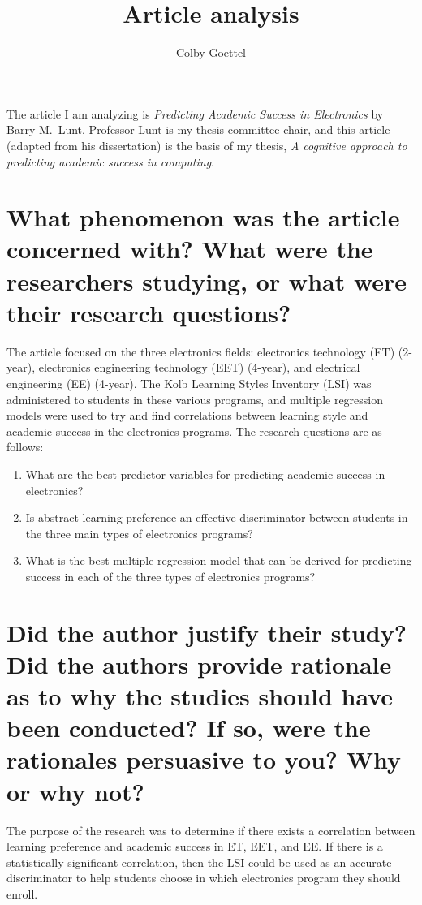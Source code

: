 \documentclass[12pt]{article}
\title{Article analysis}
\author{Colby Goettel}
\begin{document}
\maketitle

The article I am analyzing is \textit{Predicting Academic Success in Electronics} by Barry M.\ Lunt. Professor Lunt is my thesis committee chair, and this article (adapted from his dissertation) is the basis of my thesis, \textit{A cognitive approach to predicting academic success in computing}.

\section{What phenomenon was the article concerned with? What were the researchers studying, or what were their research questions?}
The article focused on the three electronics fields: electronics technology (ET) (2-year), electronics engineering technology (EET) (4-year), and electrical engineering (EE) (4-year). The Kolb Learning Styles Inventory (LSI) was administered to students in these various programs, and multiple regression models were used to try and find correlations between learning style and academic success in the electronics programs. The research questions are as follows:
\begin{enumerate}
    \item What are the best predictor variables for predicting academic success in electronics?
    \item Is abstract learning preference an effective discriminator between students in the three main types of electronics programs?
    \item What is the best multiple-regression model that can be derived for predicting success in each of the three types of electronics programs?
\end{enumerate}

\section{Did the author justify their study? Did the authors provide rationale as to why the studies should have been conducted? If so, were the rationales persuasive to you? Why or why not?}
The purpose of the research was to determine if there exists a correlation between learning preference and academic success in ET, EET, and EE. If there is a statistically significant correlation, then the LSI could be used as an accurate discriminator to help students choose in which electronics program they should enroll.
\end{document}
